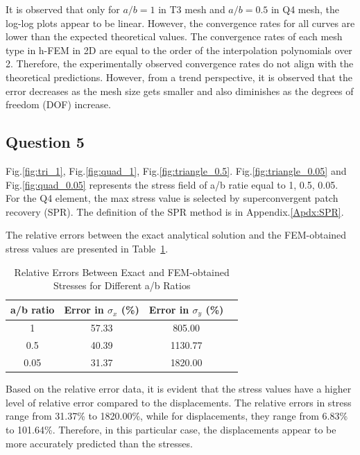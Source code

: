 \documentclass[twoside,twocolumn,10pt]{article}
\begin{document}
It is observed that only for \(a/b = 1\) in T3 mesh and \(a/b = 0.5\) in Q4 mesh, the log-log plots appear to be linear. However, the convergence rates for all curves are lower than the expected theoretical values. The convergence rates of each mesh type in h-FEM in 2D are equal to the order of the interpolation polynomials over 2. Therefore, the experimentally observed convergence rates do not align with the theoretical predictions. However, from a trend perspective, it is observed that the error decreases as the mesh size gets smaller and also diminishes as the degrees of freedom (DOF) increase.

 
\subsection{Question 5}
Fig.\ref{fig:tri_1}, Fig.\ref{fig:quad_1}, Fig.\ref{fig:triangle_0.5}. Fig.\ref{fig:triangle_0.05} and Fig.\ref{fig:quad_0.05} represents the stress field of a/b ratie equal to {1, 0.5, 0.05}. For the Q4 element, the max stress value is selected by superconvergent patch recovery (SPR). The definition of the SPR method is in Appendix.\ref{Apdx:SPR}.


The relative errors between the exact analytical solution and the FEM-obtained stress values are presented in Table~\ref{tab:stress_error}.

\begin{table}[h]
\centering
\caption{Relative Errors Between Exact and FEM-obtained Stresses for Different a/b Ratios}
\label{tab:stress_error}
\begin{tabular}{cccc}
\toprule
a/b ratio & Error in \( \sigma_{x} \) (\%) & Error in \( \sigma_{y} \) (\%) \\
\midrule
1 & 57.33 & 805.00 \\
0.5 & 40.39 & 1130.77 \\
0.05 & 31.37 & 1820.00 \\
\bottomrule
\end{tabular}
\end{table}

Based on the relative error data, it is evident that the stress values have a higher level of relative error compared to the displacements. The relative errors in stress range from 31.37\% to 1820.00\%, while for displacements, they range from 6.83\% to 101.64\%. Therefore, in this particular case, the displacements appear to be more accurately predicted than the stresses.
\end{document}
